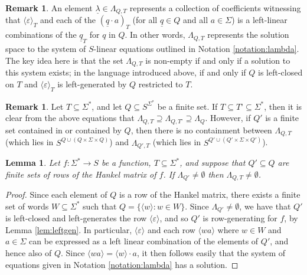 \documentclass[10pt,a4paper]{amsart}
\newtheorem{lem}[thm]{Lemma}
\theoremstyle{definition}
\newtheorem{rem}[thm]{Remark}
\numberwithin{equation}{section}
\numberwithin{theorem}{section}
\begin{document}
\begin{rem}
\label{rem:lambda}
An element $\underline{\lambda} \in \Lambda_{Q,T}$ represents a collection of coefficients witnessing that $\langle \varepsilon \rangle_T$ and each of the $(\underline{q} \cdot a)_T$ (for all $\underline{q} \in Q$ and all $a \in \Sigma$) is a left-linear combinations of the $\underline{q}_T$ for $q$ in $Q$. In other words, $\Lambda_{Q, T}$ represents the solution space to the system of $S$-linear equations outlined in Notation \ref{notation:lambda}.
The key idea here is that the set $\Lambda_{Q, T}$ is non-empty if and only if a solution to this system exists; in the language introduced above, if and only if $Q$ is left-closed on $T$ and $\langle \varepsilon \rangle_T$ is left-generated by $Q$ restricted to $T$.
\end{rem}
\begin{rem}
\label{rem:subsets}
Let $T \subseteq \Sigma^*$, and let $Q \subseteq S^{\Sigma^*}$ be a finite set. If $T \subseteq T’ \subseteq \Sigma^*$, then it is clear from the above equations that $\Lambda_{Q, T} \supseteq \Lambda_{Q, T’}\supseteq \Lambda_{Q}$. However, if $Q'$ is a finite set contained in or contained by $Q$, then there is no containment between $\Lambda_{Q, T}$ (which lies in $S^{Q \cup (Q \times \Sigma \times Q)}$) and $\Lambda_{Q', T}$ (which lies in $S^{Q' \cup (Q' \times \Sigma \times Q')}$).
\end{rem}
\begin{lem}
\label{lem:Qincrement}
Let $f:\Sigma^* \rightarrow S$ be a function, $T \subseteq \Sigma^*$, and suppose that $Q' \subseteq Q$ are finite sets of rows of the Hankel matrix of $f$. If $\Lambda_{Q'} \neq \emptyset$ then $\Lambda_{Q, T} \neq \emptyset$.
\end{lem}
\begin{proof}
Since each element of $Q$ is a row of the Hankel matrix, there exists a finite set of words $W \subseteq \Sigma^*$ such that $Q = \{\langle w \rangle: w \in W\}$. Since $\Lambda_{Q'} \neq \emptyset$, we have that $Q'$ is left-closed and left-generates the row $\langle \varepsilon \rangle$, and so $Q'$ is row-generating for $f$, by Lemma \ref{lem:leftgen}. In particular, $\langle \varepsilon \rangle$ and each row $\langle wa \rangle$ where $w \in W$ and $a \in \Sigma$ can be expressed as a left linear combination of the elements of $Q'$, and hence also of $Q$. Since $\langle wa \rangle = \langle w \rangle \cdot a$, it then follows easily that the system of equations given in Notation \ref{notation:lambda} has a solution.
\end{proof}
\end{document}
